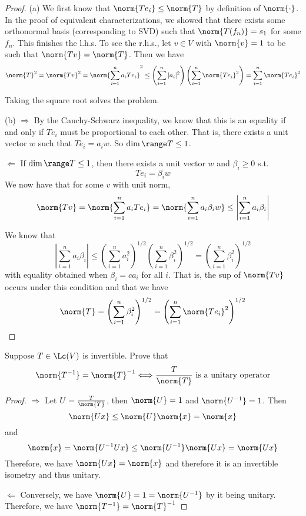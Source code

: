 \documentclass{extarticle}
\begin{document}
\begin{proof}
(a) We first know that \(\norm{T e_i} \leq \norm{T}\) by definition of \(\norm{\cdot}\). In the proof
of equivalent characterizations, we showed that there exists some orthonormal basis (corresponding to SVD)
such that \(\norm{T(f_n)} = s_1\) for some \(f_n\). This finishes the l.h.s. To see the r.h.s.,
let \(v \in V\) with \(\norm{v} = 1\) to be such that \(\norm{Tv} = \norm{T}\). Then we have
\begin{align*}
    \norm{T}^2 = \norm{Tv}^2 = \norm{ \sum_{i=1}^{n} a_i  Te_i}^2
    \leq \left(\sum_{i=1}^{n} |a_i|^2 \right) \left(\sum_{i=1}^{n} \norm{Te_i}^2 \right)
    = \sum_{i=1}^{n} \norm{Te_i}^2
\end{align*}

Taking the square root solves the problem.

(b) \(\Rightarrow\) By the Cauchy-Schwarz inequality, we know that this is an equality if and only if
\(Te_i\) must be proportional to each other. That is, there exists
a unit vector \(w\) such that \(Te_i = a_i w\). So \(\dim \range T \leq 1\).

\(\Leftarrow\) If \(\dim \range T \leq 1\), then there exists a unit vector \(w\) and
\(\beta_i \geq 0\) s.t.
\[Te_i = \beta_i w\]
We now have that for some \(v\) with unit norm,
\[\norm{Tv} = \norm{\sum_{i=1}^{n} a_i T e_i} =
\norm{\sum_{i=1}^{n}a_i \beta_i w} \leq \left|\sum_{i=1}^{n} a_i \beta_i \right|\]

We know that
\[\left|\sum_{i=1}^{n} a_i \beta_i \right| \leq \left(\sum_{i=1}^{n} a_i^2 \right)^{1/2} \left(\sum_{i=1}^{n} \beta_i^2 \right)^{1/2}
= \left(\sum_{i=1}^{n} \beta_i^2 \right)^{1/2}\]
with equality obtained when \(\beta_i = c a_i\) for all \(i\). That is, the sup of \(\norm{Tv}\)
occurs under this condition and that we have
\[\norm{T} = \left(\sum_{i=1}^{n} \beta_i^2 \right)^{1/2} = \left(\sum_{i=1}^{n} \norm{Te_i}^2 \right)^{1/2}\]
\end{proof}

\begin{problem}{24}
    Suppose \(T \in \Lc(V)\) is invertible. Prove that
    \[\norm{T^{-1}} = \norm{T}^{-1} \Longleftrightarrow \frac{T}{\norm{T}} \text{ is a unitary operator}\]
\end{problem}

\begin{proof}
\(\Rightarrow\) Let \(U = \frac{T}{\norm{T}}\), then \(\norm{U} = 1\) and \(\norm{U^{-1}} = 1\). Then
\[\norm{Ux} \leq \norm{U}\norm{x} = \norm{x}\]
and
\[\norm{x} = \norm{U^{-1}Ux} \leq \norm{U^{-1}}\norm{Ux} = \norm{Ux}\]
Therefore, we have \(\norm{Ux} = \norm{x}\) and therefore it is an invertible isometry and thus unitary.

\(\Leftarrow\) Conversely, we have \(\norm{U} = 1 = \norm{U^{-1}}\) by it being unitary. Therefore, we have
\(\norm{T^{-1}} = \norm{T}^{-1}\)
\end{proof}
\end{document}
